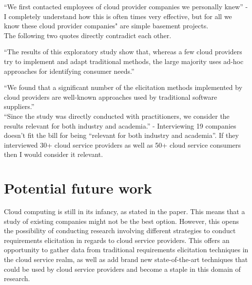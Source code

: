 \documentclass[10pt,twoside]{IEEEtran}
\begin{document}
``We first contacted employees of cloud provider companies we personally knew'' - I completely understand how this is often times very effective, but for all we know these cloud provider companies" are simple basement projects. \\

The following two quotes directly contradict each other.

``The results of this exploratory study show that, whereas a few cloud providers try to implement and adapt traditional methods, the large majority uses ad-hoc
approaches for identifying consumer needs.'' 

``We found that a significant number of the elicitation methods implemented by cloud providers are well-known approaches used by traditional software suppliers.'' \\

``Since the study was directly conducted with practitioners, we consider the results relevant for both industry and academia.'' - Interviewing 19 companies doesn't fit the bill for being ``relevant for both industry and academia''. If they interviewed 30+ cloud service providers as well as 50+ cloud service consumers then I would consider it relevant.

\section{Potential future work}
Cloud computing is still in its infancy, as stated in the paper. This means that a study of existing companies might not be the best option. However, this opens the possibility of conducting research involving different strategies to conduct requirements elicitation in regards to cloud service providers. This offers an opportunity to gather data from traditional requirements elicitation techniques in the cloud service realm, as well as add brand new state-of-the-art techniques that could be used by cloud service providers and become a staple in this domain of research.\\
\end{document}
